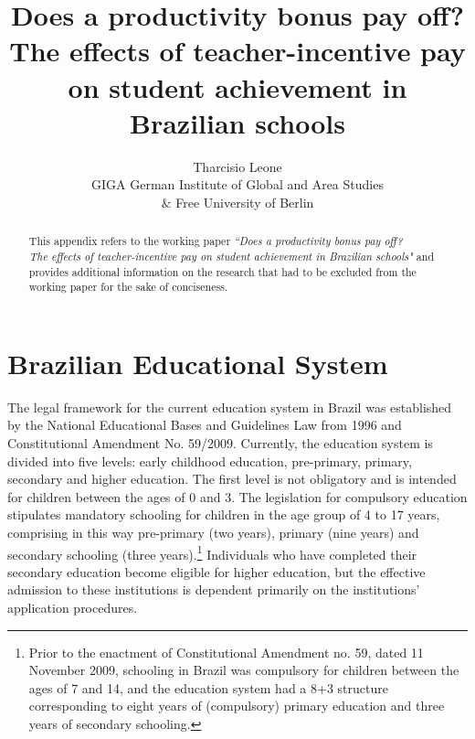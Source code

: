 \documentclass[a4paper, 12pt]{article}
\title{Does a productivity bonus pay off? \\ \normalsize The effects of teacher-incentive pay on student achievement in Brazilian schools}
\author{\vspace{-0.5em} Tharcisio Leone \\ \vspace{-0.5em} \small GIGA German Institute of Global and Area Studies \\ \small $\&$ Free University of Berlin}
\let\ACMmaketitle=\maketitle
\renewcommand{\maketitle}{\begingroup\let\footnote=\thanks \ACMmaketitle\endgroup}
\begin{document}
\maketitle

\makeatletter
\renewcommand*\l@section{\@dottedtocline{1}{1em}{2.5em}}
\makeatother



\renewcommand*\abstractname{Supplementary Material}

\begin{abstract}
This appendix refers to the working paper \textit{``Does a productivity bonus pay off? \\ The effects of teacher-incentive pay on student achievement in Brazilian schools"} and provides additional information on the research that had to be excluded from the working paper for the sake of conciseness.
\end{abstract}





\newpage

{
  \hypersetup{linkcolor=black}
  \tableofcontents
}

\newpage

\section{Brazilian Educational System}
The legal framework for the current education system in Brazil was established by the National Educational Bases and Guidelines Law from 1996 and Constitutional Amendment No. 59/2009. Currently, the education system is divided into five levels: early childhood education, pre-primary, primary, secondary and higher education. The first level is not obligatory and is intended for children between the ages of 0 and 3. The legislation for compulsory education stipulates mandatory schooling for children in the age group of 4 to 17 years, comprising in this way pre-primary (two years), primary (nine years) and secondary schooling (three years).\footnote{Prior to the enactment of Constitutional Amendment no. 59, dated 11 November 2009, schooling in Brazil was compulsory for children between the ages of 7 and 14, and the education system had a 8+3 structure corresponding to eight years of (compulsory) primary education and three years of secondary schooling.} Individuals who have completed their secondary education become eligible for higher education, but the effective admission to these institutions is dependent primarily on the institutions’ application procedures.
\end{document}
